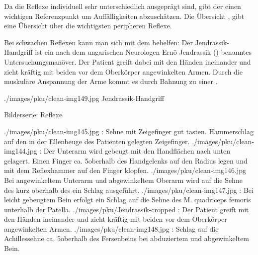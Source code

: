 {Da die Reflexe individuell sehr unterschiedlich ausgeprägt
sind, gibt der  einen wichtigen
Referenzpunkt um Auffälligkeiten abzuschätzen. 
Die Übersicht , gibt
eine Übersicht über die wichtigsten peripheren Reflexe.

Bei schwachen Reflexen kann man sich mit dem
behelfen: Der Jendrassik-Handgriff ist ein nach dem
ungarischen Neurologen Ernö Jendrassik ()
benanntes Untersuchungsmanöver.
Der Patient greift dabei mit den Händen ineinander und zieht
kräftig mit beiden vor dem Oberkörper angewinkelten Armen.
Durch die muskuläre Anspannung der Arme kommt es durch
Bahnung zu einer .
% 
\bigskip
}{}
{./images/pku/clean-img149.jpg}
{Jendrassik-Handgriff}
{}


\begin{PictureSeriesWide}{}{Bilderserie:
Reflexe\label{fig:bilderserie-reflexe}}

{./images/pku/clean-img145.jpg}
{:
Sehne mit Zeigefinger gut tasten. Hammerschlag auf den in
der Ellenbeuge des Patienten gelegten Zeigefinger.
}
{./images/pku/clean-img144.jpg}
{:
Der Unterarm wird gebeugt mit den Handflächen nach unten
gelagert. 
Einen Finger ca. 5\CM* oberhalb des Handgelenks auf den
Radius legen und mit dem Reflexhammer auf den Finger
klopfen. 
}
{./images/pku/clean-img146.jpg}
{ 
Bei angewinkeltem Unterarm und abgewinkeltem Oberarm wird auf
die Sehne des
kurz oberhalb des  ein Schlag
ausgeführt.  
}
{}
{}
{./images/pku/clean-img147.jpg}
{:
Bei leicht gebeugtem Bein erfolgt ein Schlag auf die Sehne des M.
quadriceps femoris unterhalb der Patella.
}
{./images/pku/Jendrassik-cropped}
{:
Der Patient greift mit den Händen ineinander und zieht
kräftig mit beiden vor dem Oberkörper angewinkelten Armen.}
{./images/pku/clean-img148.jpg}
{:
Schlag auf die Achillessehne ca. 5\CM* oberhalb des
Fersenbeins bei abduziertem und abgewinkeltem Bein.
}
{}
{}
\end{PictureSeriesWide}


